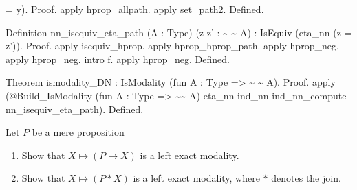 \begin{coqdoccode}
\begin{coqdoccomment}
=\coqdocindent{0.50em}
y).\coqdoceol
Proof.\coqdoceol
\coqdocindent{1.00em}
apply\coqdocindent{0.50em}
hprop\_allpath.\coqdoceol
\coqdocindent{1.00em}
apply\coqdocindent{0.50em}
set\_path2.\coqdoceol
Defined.\coqdoceol
\end{coqdoccomment}
\coqdoceol
\coqdocemptyline
\coqdocnoindent
\begin{coqdoccomment}
\coqdoceol
Definition\coqdocindent{0.50em}
nn\_isequiv\_eta\_path\coqdocindent{0.50em}
(A\coqdocindent{0.50em}
:\coqdocindent{0.50em}
Type)\coqdocindent{0.50em}
(z\coqdocindent{0.50em}
z'\coqdocindent{0.50em}
:\coqdocindent{0.50em}
\~{}\coqdocindent{0.50em}
\~{}\coqdocindent{0.50em}
A)\coqdocindent{0.50em}
:\coqdocindent{0.50em}
\coqdoceol
\coqdocindent{1.00em}
IsEquiv\coqdocindent{0.50em}
(eta\_nn\coqdocindent{0.50em}
(z\coqdocindent{0.50em}
=\coqdocindent{0.50em}
z')).\coqdoceol
Proof.\coqdoceol
\coqdocindent{1.00em}
apply\coqdocindent{0.50em}
isequiv\_hprop.\coqdoceol
\coqdocindent{1.00em}
apply\coqdocindent{0.50em}
hprop\_hprop\_path.\coqdocindent{0.50em}
apply\coqdocindent{0.50em}
hprop\_neg.\coqdocindent{0.50em}
apply\coqdocindent{0.50em}
hprop\_neg.\coqdoceol
\coqdocindent{1.00em}
intro\coqdocindent{0.50em}
f.\coqdocindent{0.50em}
apply\coqdocindent{0.50em}
hprop\_neg.\coqdoceol
Defined.\coqdoceol
\end{coqdoccomment}
\coqdoceol
\coqdocemptyline
\coqdocnoindent
\begin{coqdoccomment}
\coqdoceol
Theorem\coqdocindent{0.50em}
ismodality\_DN\coqdocindent{0.50em}
:\coqdocindent{0.50em}
IsModality\coqdocindent{0.50em}
(fun\coqdocindent{0.50em}
A\coqdocindent{0.50em}
:\coqdocindent{0.50em}
Type\coqdocindent{0.50em}
=>\coqdocindent{0.50em}
\~{}\coqdocindent{0.50em}
\~{}\coqdocindent{0.50em}
A).\coqdoceol
Proof.\coqdoceol
\coqdocindent{1.00em}
apply\coqdocindent{0.50em}
(@Build\_IsModality\coqdocindent{0.50em}
(fun\coqdocindent{0.50em}
A\coqdocindent{0.50em}
:\coqdocindent{0.50em}
Type\coqdocindent{0.50em}
=>\coqdocindent{0.50em}
\~{}\~{}\coqdocindent{0.50em}
A)\coqdoceol
\coqdocindent{13.50em}
eta\_nn\coqdoceol
\coqdocindent{13.50em}
ind\_nn\coqdoceol
\coqdocindent{13.50em}
ind\_nn\_compute\coqdoceol
\coqdocindent{13.50em}
nn\_isequiv\_eta\_path).\coqdoceol
Defined.\coqdoceol
\end{coqdoccomment}
\coqdoceol
\coqdocemptyline
\coqdocemptyline
\end{coqdoccode}
Let $P$ be a mere proposition
\begin{enumerate}
\item Show that $X \mapsto (P \to X)$ is a left exact modality.
\item Show that $X \mapsto (P * X)$ is a left exact modality, where $*$ denotes
    the join.
\end{enumerate}



